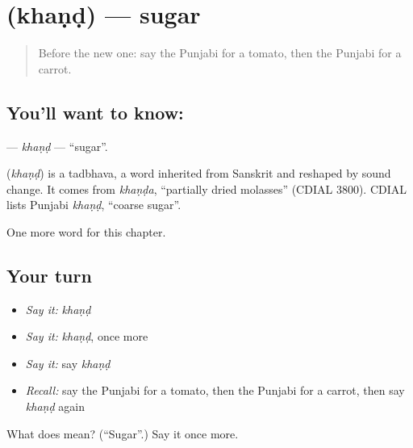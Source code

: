 \section[\texorpdfstring{\pa{ਖੰਡ} (khaṇḍ)}{ਖੰਡ (khaṇḍ)}]{ (khaṇḍ) — sugar}

\label{lesson:PA-C65-khand}



\begin{quote}
Before the new one: say the Punjabi for a tomato, then the Punjabi for a carrot.
\end{quote}

\subsection*{You'll want to know: }
\textbf{} — \emph{khaṇḍ} — \textquotedblleft{}sugar\textquotedblright{}.

\begin{cousinweb}
\textbf{} (\emph{khaṇḍ}) is a tadbhava, a word inherited from Sanskrit and reshaped by sound change. It comes from \emph{khaṇḍa}, \textquotedblleft{}partially dried molasses\textquotedblright{} (CDIAL 3800). CDIAL lists Punjabi \emph{khaṇḍ}, \textquotedblleft{}coarse sugar\textquotedblright{}.
\end{cousinweb}

\begin{grammarlens}[title={What you've built}]
One more word for this chapter.
\end{grammarlens}

\subsection*{Your turn}
\begin{itemize}
\raggedright
  \item \emph{Say it:} \emph{khaṇḍ}
  \item \emph{Say it:} \emph{khaṇḍ}, once more
  \item \emph{Say it:} say \emph{khaṇḍ}
  \item \emph{Recall:} say the Punjabi for a tomato, then the Punjabi for a carrot, then say \emph{khaṇḍ} again
\end{itemize}

\begin{tcolorbox}[breakable,colback=teal!4,colframe=teal!35!black,title={Before you move on}]
What does  mean? (\textquotedblleft{}Sugar\textquotedblright{}.) Say it once more.
\end{tcolorbox}
